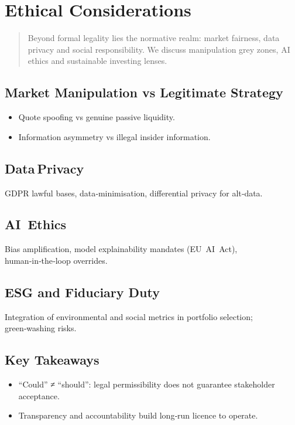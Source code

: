 \chapter{Ethical Considerations}\label{ch:ethics}

\begin{abstract}
Beyond formal legality lies the normative realm: market fairness, data
privacy and social responsibility.  We discuss manipulation grey zones,
AI ethics and sustainable investing lenses.
\end{abstract}

\section{Market Manipulation vs Legitimate Strategy}

\begin{itemize}
  \item Quote spoofing vs genuine passive liquidity.
  \item Information asymmetry vs illegal insider information.
\end{itemize}

\section{Data Privacy}

GDPR lawful bases, data‑minimisation, differential privacy for alt‑data.

\section{AI Ethics}

Bias amplification, model explainability mandates (EU AI Act),
human‑in‑the‑loop overrides.

\section{ESG and Fiduciary Duty}

Integration of environmental and social metrics in portfolio selection;
green‑washing risks.

\section*{Key Takeaways}

\begin{itemize}
  \item “Could” ≠ “should”: legal permissibility does not guarantee
        stakeholder acceptance.
  \item Transparency and accountability build long‑run licence to operate.
\end{itemize}
